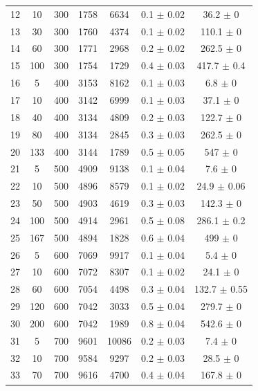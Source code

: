 \documentclass[11pt]{article}
\begin{document}
\begin{table}[]
{\begin{tabular}{ccccccc}
				12 & 10 & 300 & 1758 & 6634 & 0.1 $\pm$ 0.02 & 36.2 $\pm$ 0 \\
				\rowcolor[HTML]{EFEFEF} 
				13 & 30 & 300 & 1760 & 4374 & 0.1 $\pm$ 0.02 & 110.1 $\pm$ 0 \\
				\rowcolor[HTML]{EFEFEF} 
				14 & 60 & 300 & 1771 & 2968 & 0.2 $\pm$ 0.02 & 262.5 $\pm$ 0 \\
				\rowcolor[HTML]{EFEFEF} 
				15 & 100 & 300 & 1754 & 1729 & 0.4 $\pm$ 0.03 & 417.7 $\pm$ 0.4 \\
				16 & 5 & 400 & 3153 & 8162 & 0.1 $\pm$ 0.03 & 6.8 $\pm$ 0 \\
				17 & 10 & 400 & 3142 & 6999 & 0.1 $\pm$ 0.03 & 37.1 $\pm$ 0 \\
				18 & 40 & 400 & 3134 & 4809 & 0.2 $\pm$ 0.03 & 122.7 $\pm$ 0 \\
				19 & 80 & 400 & 3134 & 2845 & 0.3 $\pm$ 0.03 & 262.5 $\pm$ 0 \\
				20 & 133 & 400 & 3144 & 1789 & 0.5 $\pm$ 0.05 & 547 $\pm$ 0 \\
				\rowcolor[HTML]{EFEFEF} 
				21 & 5 & 500 & 4909 & 9138 & 0.1 $\pm$ 0.04 & 7.6 $\pm$ 0 \\
				\rowcolor[HTML]{EFEFEF} 
				22 & 10 & 500 & 4896 & 8579 & 0.1 $\pm$ 0.02 & 24.9 $\pm$ 0.06 \\
				\rowcolor[HTML]{EFEFEF} 
				23 & 50 & 500 & 4903 & 4619 & 0.3 $\pm$ 0.03 & 142.3 $\pm$ 0 \\
				\rowcolor[HTML]{EFEFEF} 
				24 & 100 & 500 & 4914 & 2961 & 0.5 $\pm$ 0.08 & 286.1 $\pm$ 0.2 \\
				\rowcolor[HTML]{EFEFEF} 
				25 & 167 & 500 & 4894 & 1828 & 0.6 $\pm$ 0.04 & 499 $\pm$ 0 \\
				26 & 5 & 600 & 7069 & 9917 & 0.1 $\pm$ 0.04 & 5.4 $\pm$ 0 \\
				27 & 10 & 600 & 7072 & 8307 & 0.1 $\pm$ 0.02 & 24.1 $\pm$ 0 \\
				28 & 60 & 600 & 7054 & 4498 & 0.3 $\pm$ 0.04 & 132.7 $\pm$ 0.55 \\
				29 & 120 & 600 & 7042 & 3033 & 0.5 $\pm$ 0.04 & 279.7 $\pm$ 0 \\
				30 & 200 & 600 & 7042 & 1989 & 0.8 $\pm$ 0.04 & 542.6 $\pm$ 0 \\
				\rowcolor[HTML]{EFEFEF} 
				31 & 5 & 700 & 9601 & 10086 & 0.2 $\pm$ 0.03 & 7.4 $\pm$ 0 \\
				\rowcolor[HTML]{EFEFEF} 
				32 & 10 & 700 & 9584 & 9297 & 0.2 $\pm$ 0.03 & 28.5 $\pm$ 0 \\
				\rowcolor[HTML]{EFEFEF} 
				33 & 70 & 700 & 9616 & 4700 & 0.4 $\pm$ 0.04 & 167.8 $\pm$ 0 \\

\end{tabular}}
\end{table}
\end{document}
